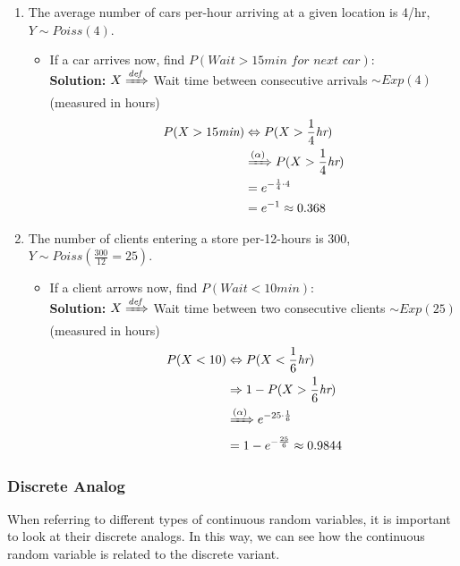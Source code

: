 \documentclass{article}
\begin{document}
\begin{enumerate}
    \item The average number of cars per-hour arriving at a given location is 4/hr, $Y \sim Poiss(4)$.
    \begin{itemize}
        \item If a car arrives now, find $P(\textit{Wait} > 15 \textit{min for next car})$: \\
        \textbf{Solution:} $X \xRightarrow{\textit{def}}$ Wait time between consecutive arrivals $\sim Exp(4)$ (measured in hours)
        \begin{align*}
            P(X > 15 \textit{min}) &\Leftrightarrow P(X > \frac{1}{4} \textit{hr}) \\
            &\xRightarrow{(\alpha)} P(X > \frac{1}{4} \textit{hr}) \\ 
            &= e^{-\frac{1}{4} \cdot 4} \\
            &= e^{-1} \approx 0.368
        \end{align*}
    \end{itemize}
    \item The number of clients entering a store per-12-hours is 300, $Y \sim Poiss(\frac{300}{12} = 25)$.
    \begin{itemize}
        \item If a client arrows now, find $P(Wait < 10 \textit{min})$: \\
        \textbf{Solution:} $X \xRightarrow{\textit{def}}$ Wait time between two consecutive clients $\sim Exp(25)$ (measured in hours)
        \begin{align*}
            P(X < 10) &\Leftrightarrow P(X < \frac{1}{6} \textit{hr}) \\
            &\Rightarrow 1 - P(X > \frac{1}{6} \textit{hr}) \\
            &\xRightarrow{(\alpha)} e^{-25 \cdot \frac{1}{6}} \\
            &= 1 - e^{-\frac{25}{6}} \approx 0.9844
        \end{align*}
    \end{itemize}
\end{enumerate}

\subsubsection{Discrete Analog}

When referring to different types of continuous random variables, it is important to look at their discrete analogs. In this way, we can see how the continuous random variable is related to the discrete variant.
\end{document}
